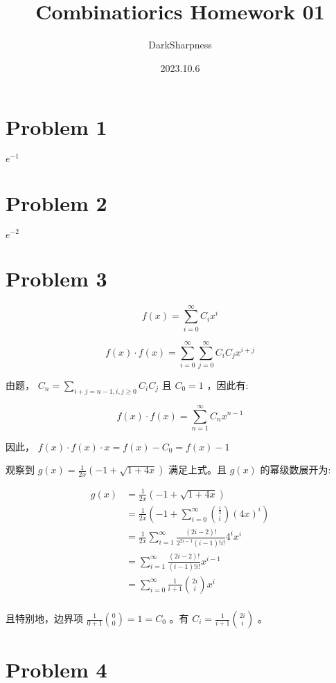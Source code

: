 \documentclass{article}
\title{\heiti\zihao{2} Combinatiorics Homework 01}
\author{DarkSharpness}
\date{2023.10.6}
\begin{document}
	\maketitle

\tableofcontents

\section*{Problem 1} $e^{-1}$

\section*{Problem 2} $e^{-2}$

\section*{Problem 3}

$$f(x) = \sum_{i = 0}^{\infty} C_i x^{i}$$

$$f(x) \cdot f(x) = \sum_{i = 0}^{\infty} \sum_{j = 0}^{\infty} C_i C_j x^{i + j}$$

由题， $C_n = \sum_{i + j = n - 1, i, j \geq 0} C_i C_j$ 且 $C_0 = 1$ ，因此有:

$$f(x) \cdot f(x) = \sum_{n = 1}^{\infty} C_n x^{n - 1}$$

因此， $f(x) \cdot f(x) \cdot x = f(x) - C_0 = f(x) - 1$

观察到 $g(x) = \frac{1}{2x} (-1 + \sqrt{1 + 4x})$ 满足上式。且 $g(x)$ 的幂级数展开为:

$$
\begin{aligned}
    g(x)
        &= \frac{1}{2x} (-1 + \sqrt{1 + 4x}) \\
        &= \frac{1}{2x} (-1 + \sum_{i = 0}^{\infty} { {\frac{1}{2} \choose i} (4x) ^ i  }) \\
        &= \frac{1}{2x} \sum_{i = 1}^{\infty} { \frac{(2i - 2)!}{2 ^ {2i - 1}(i - 1)!i!} 4^i x ^ i }  \\
        &= \sum_{i = 1}^{\infty} { \frac{(2i - 2)!}{(i - 1)!i!} x ^ {i - 1} }  \\
        &= \sum_{i = 0}^{\infty} { \frac{1}{i + 1} {2i \choose i} x ^ {i} }  \\
\end{aligned}
$$

且特别地，边界项 $\frac{1}{0 + 1} {0 \choose 0} = 1 = C_0$ 。有 $C_i = \frac{1}{i + 1} {2i \choose i}$ 。

\section*{Problem 4}
\end{document}
